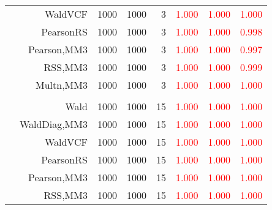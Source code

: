 \documentclass[
]{article}
\begin{document}
\begin{table}[H]
{\begin{tabular}[t]{lrrrrrrr}
\hspace{1em} & WaldVCF & 1000 & 1000 & 3 & \textcolor{red}{1.000} & \textcolor{red}{1.000} & \textcolor{red}{1.000}\\

\hspace{1em} & PearsonRS & 1000 & 1000 & 3 & \textcolor{red}{1.000} & \textcolor{red}{1.000} & \textcolor{red}{0.998}\\

\hspace{1em} & Pearson,MM3 & 1000 & 1000 & 3 & \textcolor{red}{1.000} & \textcolor{red}{1.000} & \textcolor{red}{0.997}\\

\hspace{1em} & RSS,MM3 & 1000 & 1000 & 3 & \textcolor{red}{1.000} & \textcolor{red}{1.000} & \textcolor{red}{0.999}\\

\hspace{1em} & Multn,MM3 & 1000 & 1000 & 3 & \textcolor{red}{1.000} & \textcolor{red}{1.000} & \textcolor{red}{1.000}\\
\cmidrule{1-8}
\addlinespace[0.3em]
\multicolumn{8}{l}{\textbf{1F 15V}}\\
\hspace{1em} & Wald & 1000 & 1000 & 15 & \textcolor{red}{1.000} & \textcolor{red}{1.000} & \textcolor{red}{1.000}\\

\hspace{1em} & WaldDiag,MM3 & 1000 & 1000 & 15 & \textcolor{red}{1.000} & \textcolor{red}{1.000} & \textcolor{red}{1.000}\\

\hspace{1em} & WaldVCF & 1000 & 1000 & 15 & \textcolor{red}{1.000} & \textcolor{red}{1.000} & \textcolor{red}{1.000}\\

\hspace{1em} & PearsonRS & 1000 & 1000 & 15 & \textcolor{red}{1.000} & \textcolor{red}{1.000} & \textcolor{red}{1.000}\\

\hspace{1em} & Pearson,MM3 & 1000 & 1000 & 15 & \textcolor{red}{1.000} & \textcolor{red}{1.000} & \textcolor{red}{1.000}\\

\hspace{1em} & RSS,MM3 & 1000 & 1000 & 15 & \textcolor{red}{1.000} & \textcolor{red}{1.000} & \textcolor{red}{1.000}\\


\end{tabular}}
\end{table}
\end{document}
